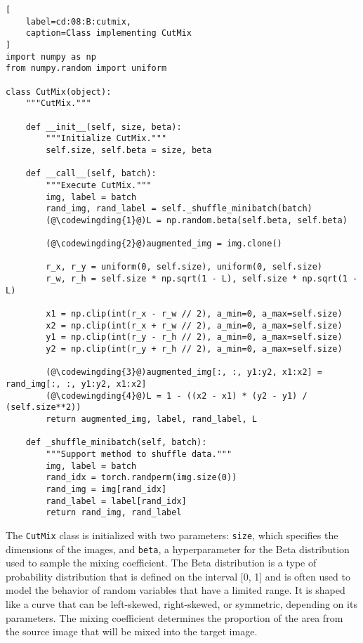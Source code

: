 \begin{lstlisting}[
    label=cd:08:B:cutmix,
    caption=Class implementing CutMix
]
import numpy as np
from numpy.random import uniform

class CutMix(object):
    """CutMix."""

    def __init__(self, size, beta):
        """Initialize CutMix."""
        self.size, self.beta = size, beta

    def __call__(self, batch):
        """Execute CutMix."""
        img, label = batch
        rand_img, rand_label = self._shuffle_minibatch(batch)
        (@\codewingding{1}@)L = np.random.beta(self.beta, self.beta)

        (@\codewingding{2}@)augmented_img = img.clone()

        r_x, r_y = uniform(0, self.size), uniform(0, self.size)
        r_w, r_h = self.size * np.sqrt(1 - L), self.size * np.sqrt(1 - L)

        x1 = np.clip(int(r_x - r_w // 2), a_min=0, a_max=self.size)
        x2 = np.clip(int(r_x + r_w // 2), a_min=0, a_max=self.size)
        y1 = np.clip(int(r_y - r_h // 2), a_min=0, a_max=self.size)
        y2 = np.clip(int(r_y + r_h // 2), a_min=0, a_max=self.size)

        (@\codewingding{3}@)augmented_img[:, :, y1:y2, x1:x2] = rand_img[:, :, y1:y2, x1:x2]
        (@\codewingding{4}@)L = 1 - ((x2 - x1) * (y2 - y1) / (self.size**2))
        return augmented_img, label, rand_label, L

    def _shuffle_minibatch(self, batch):
        """Support method to shuffle data."""
        img, label = batch
        rand_idx = torch.randperm(img.size(0))
        rand_img = img[rand_idx]
        rand_label = label[rand_idx]
        return rand_img, rand_label
\end{lstlisting}
The \lstinline{CutMix} class is initialized with two parameters: \lstinline{size}, which specifies the dimensions of the images, and \lstinline{beta}, a hyperparameter for the Beta distribution used to sample the mixing coefficient. The Beta distribution is a type of probability distribution that is defined on the interval [0, 1] and is often used to model the behavior of random variables that have a limited range. It is shaped like a curve that can be left-skewed, right-skewed, or symmetric, depending on its parameters. The mixing coefficient determines the proportion of the area from the source image that will be mixed into the target image. 

